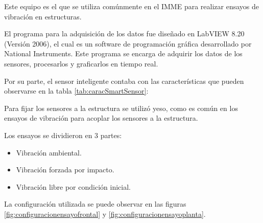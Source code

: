 Este equipo es el que se utiliza comúnmente en el IMME para realizar ensayos de vibración en estructuras.

El programa para la adquisición de los datos fue diseñado en LabVIEW 8.20 (Versión 2006), el cual es un software de programación gráfica desarrollado por National Instruments. Este programa se encarga de adquirir los datos de los sensores, procesarlos y graficarlos en tiempo real.

Por su parte, el sensor inteligente contaba con las características que pueden observarse en la tabla \ref{tab:caracSmartSensor}:

\begin{table}[H]
    \centering
    \caption{Características de instrumentación del sensor inteligente.}
    \label{tab:caracSmartSensor}
    \end{table}

Para fijar los sensores a la estructura se utilizó yeso, como es común en los ensayos de vibración para acoplar los sensores a la estructura.

Los ensayos se dividieron en 3 partes:
\begin{itemize}
    \item Vibración ambiental.
    \item Vibración forzada por impacto.
    \item Vibración libre por condición inicial.
\end{itemize}

La configuración utilizada se puede observar en las figuras \ref{fig:configuracionensayofrontal} y \ref{fig:configuracionensayoplanta}.

